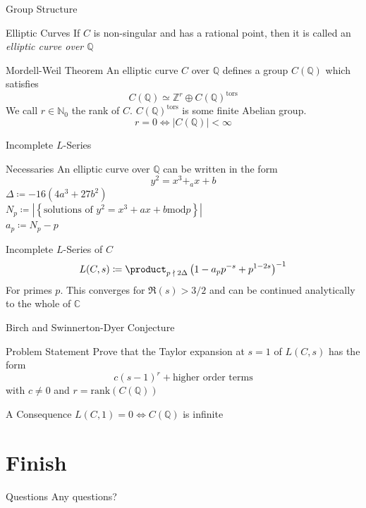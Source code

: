 \documentclass[handout]{beamer}
\newcommand{\Complex}{\mathbb{C}}
\newcommand{\Rpart}[1]{\mathfrak{R}\left(#1\right)}
\newcommand{\Rational}{\mathbb{Q}}
\newcommand{\Integer}{\mathbb{Z}}
\newcommand{\Natural}{\mathbb{N}}
\begin{document}
  \begin{frame}{Group Structure}
      \pause
      \begin{block}{Elliptic Curves}
          If $C$ is non-singular and has a rational point, then it is called an
          \textit{elliptic curve over $\Rational$}
      \end{block}
      \pause
      \begin{block}{Mordell-Weil Theorem}
          An elliptic curve $C$ over $\Rational$ defines a group $C(\Rational)$
          which satisfies 
          $$C(\Rational) \simeq \Integer^r
          \oplus C(\Rational)^{\mathrm{tors}}$$
          \pause
          We call $r \in \Natural_0$ the rank of $C$.
          $C(\Rational)^{\mathrm{tors}}$ is some finite Abelian group. \pause
          \\
          $$r = 0 \iff \left|C(\Rational)\right| < \infty$$
      \end{block}
  \end{frame}
  \begin{frame}{Incomplete $L$-Series}
      \pause
      \begin{block}{Necessaries}
          An elliptic curve over $\Rational$ can be written in the form
          $$y^2 = x^3 +_ax + b$$
          \pause
          $\Delta \coloneqq -16(4a^3 + 27b^2)$ \pause \\
          $N_p \coloneqq \left|\left\{\text{solutions of } y^2 = x^3 + ax + b
          \mathrm{ mod } p\right\}\right|$ \pause \\
          $a_p \coloneqq N_p - p$
      \end{block}
      \pause
      \begin{block}{Incomplete $L$-Series of $C$}
          $$L(C, s) \coloneqq \product_{p\; \nmid\; 2 \Delta} \left(1 -
              a_p p^{-s} + p^{1 - 2s}\right)^{-1}$$
          For primes $p$. This converges for $\Rpart{s} > 3/2$ and can be
          continued analytically to the whole of $\Complex$ 
      \end{block}
  \end{frame}
  \begin{frame}{Birch and Swinnerton-Dyer Conjecture}
      \pause
      \begin{block}{Problem Statement}
          Prove that the Taylor expansion at $s=1$ of $L(C, s)$ has the form
          $$c(s-1)^r + \text{higher order terms}$$ with $c \ne 0$ and $r =
          \mathrm{rank}(C(\Rational))$
      \end{block}
      \pause
      \begin{block}{A Consequence}
          $L(C, 1) = 0 \iff C(\Rational)$ is infinite
      \end{block}
  \end{frame}
  \section{Finish}
  \begin{frame}{Questions}
      Any questions?
  \end{frame}
\end{document}
